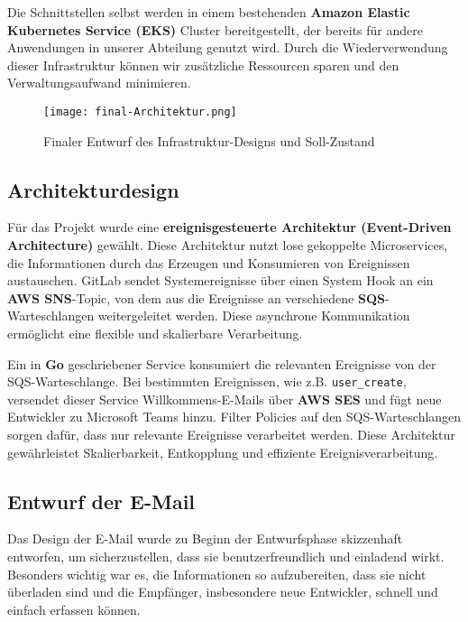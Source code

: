 Die Schnittstellen selbst werden in einem bestehenden \textbf{Amazon Elastic Kubernetes Service (EKS)} Cluster bereitgestellt, der bereits für andere Anwendungen in unserer Abteilung genutzt wird. Durch die Wiederverwendung dieser Infrastruktur können wir zusätzliche Ressourcen sparen und den Verwaltungsaufwand minimieren.

\begin{figure}[htb]
	\centering
	\texttt{[image: final-Architektur.png]}
	\caption{Finaler Entwurf des Infrastruktur-Designs und Soll-Zustand}
\end{figure}


\clearpage
\subsection{Architekturdesign}
\label{sec:Architekturdesign}

Für das Projekt  wurde eine \textbf{ereignisgesteuerte Architektur (Event-Driven Architecture)} gewählt. Diese Architektur nutzt lose gekoppelte Microservices, die Informationen durch das Erzeugen und Konsumieren von Ereignissen austauschen. GitLab sendet Systemereignisse über einen System Hook an ein \textbf{AWS SNS}-Topic, von dem aus die Ereignisse an verschiedene \textbf{SQS}-Warteschlangen weitergeleitet werden. Diese asynchrone Kommunikation ermöglicht eine flexible und skalierbare Verarbeitung.

Ein in \textbf{Go} geschriebener Service konsumiert die relevanten Ereignisse von der SQS-Warteschlange. Bei bestimmten Ereignissen, wie z.B. \texttt{user\_create}, versendet dieser Service Willkommens-E-Mails über \textbf{AWS SES} und fügt neue Entwickler zu Microsoft Teams hinzu. Filter Policies auf den SQS-Warteschlangen sorgen dafür, dass nur relevante Ereignisse verarbeitet werden. Diese Architektur gewährleistet Skalierbarkeit, Entkopplung und effiziente Ereignisverarbeitung.


\subsection{Entwurf der E-Mail}
\label{sec:Benutzeroberflaeche}

Das Design der E-Mail wurde zu Beginn der Entwurfsphase skizzenhaft entworfen, um sicherzustellen, dass sie benutzerfreundlich und einladend wirkt. Besonders wichtig war es, die Informationen so aufzubereiten, dass sie nicht überladen sind und die Empfänger, insbesondere neue Entwickler, schnell und einfach erfassen können. 

